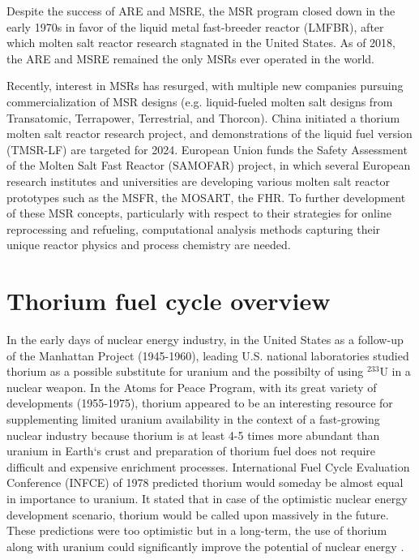 Despite the success of \gls{ARE} and \gls{MSRE}, the \gls{MSR} program closed down in the early 1970s in favor of the liquid metal fast-breeder reactor (LMFBR),\cite{macpherson_molten_1985} after which molten salt reactor research stagnated in the United States. As of 2018, the \gls{ARE} and \gls{MSRE} remained the only \glspl{MSR} ever operated in the world.

Recently, interest in \glspl{MSR} has resurged, with multiple new companies pursuing commercialization of \gls{MSR} designs (e.g. liquid-fueled molten salt designs from Transatomic, Terrapower, Terrestrial, and Thorcon). China initiated a thorium molten salt reactor research project, and demonstrations of the liquid fuel version (TMSR-LF) are targeted for 2024. European Union funds the Safety Assessment of the Molten Salt Fast Reactor (SAMOFAR) project, in which several European research institutes and universities are developing various molten salt reactor prototypes such as the \gls{MSFR}, the \gls{MOSART}, the \gls{FHR}.
To further development of these \gls{MSR} concepts, particularly with respect to their strategies for online reprocessing and refueling, computational analysis methods capturing their unique reactor physics and process chemistry are needed.

\section{Thorium fuel cycle overview}
In the early days of nuclear energy industry, in the United States as a follow-up of the Manhattan Project (1945-1960), leading U.S. national laboratories studied thorium as a possible substitute for uranium and the possibilty of using $^{233}$U in a nuclear weapon. In the Atoms for Peace Program, with its great variety of developments (1955-1975), thorium appeared to be an interesting resource for supplementing limited uranium availability in the context of a fast-growing nuclear industry because thorium is  at least 4-5 times more abundant than uranium in Earth`s crust and preparation of thorium fuel does not require difficult and expensive enrichment processes. International Fuel Cycle Evaluation Conference (INFCE) of 1978 predicted thorium would someday be almost equal in importance to uranium. It stated that in case of the optimistic nuclear energy development scenario, thorium would be called upon massively in the future. These predictions were too optimistic but in a long-term, the use of thorium along with uranium could significantly improve the potential of nuclear energy \cite{lung_perspectives_1998}.

